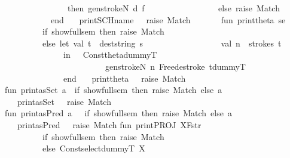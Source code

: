 \begin{isabellebody}
\ \ \ \ \ \ \ \ \ \ \ \ \ \ \ then\ genstrokeN\ d\ f\ \ \isanewline
\ \ \ \ \ \ \ \ \ \ \ \ \ \ \ else\ raise\ Match\isanewline
\ \ \ \ \ \ \ \ \ \ \ end{\isacharparenright}\isanewline
\ \ \ {\isacharbar}print{\isacharunderscore}SCH{\isacharunderscore}name\ {\isacharunderscore}\ {\isacharequal}\ {\isacharparenleft}raise\ Match{\isacharparenright}{\isacharsemicolon}\ \ \isanewline
\ \ \ \ \isanewline
fun\ print{\isacharunderscore}theta\ {\isacharbrackleft}s{\isacharcomma}e{\isacharbrackright}\ {\isacharequal}\isanewline
\ \ \ \ \ \ \ \ \ if\ {\isacharbang}show{\isacharunderscore}full{\isacharunderscore}sem\ then\ raise\ Match\ \isanewline
\ \ \ \ \ \ \ \ \ else\ let\ val\ t\ {\isacharequal}\ dest{\isacharunderscore}string\ s{\isacharsemicolon}\isanewline
\ \ \ \ \ \ \ \ \ \ \ \ \ \ \ \ \ \ val\ n\ {\isacharequal}\ strokes\ t{\isacharsemicolon}\isanewline
\ \ \ \ \ \ \ \ \ \ \ \ \ \ in\ \ \ Const{\isacharparenleft}{\isachardoublequote}{\isacharpercent}theta{\isachardoublequote}{\isacharcomma}dummyT{\isacharparenright}{\isachardollar}\isanewline
\ \ \ \ \ \ \ \ \ \ \ \ \ \ \ \ \ \ \ \ \ \ \ \ {\isacharparenleft}genstrokeN\ n\ {\isacharparenleft}Free{\isacharparenleft}destroke\ t{\isacharcomma}dummyT{\isacharparenright}{\isacharparenright}{\isacharparenright}\ \isanewline
\ \ \ \ \ \ \ \ \ \ \ \ \ \ end\isanewline
\ \ \ {\isacharbar}print{\isacharunderscore}theta\ {\isacharunderscore}\ {\isacharequal}\ raise\ Match\isanewline
\ \ \ \ \isanewline
fun\ print{\isacharunderscore}asSet\ {\isacharbrackleft}a{\isacharbrackright}\ {\isacharequal}\ if\ {\isacharbang}show{\isacharunderscore}full{\isacharunderscore}sem\ then\ raise\ Match\ else\ a\isanewline
\ \ \ {\isacharbar}print{\isacharunderscore}asSet\ {\isacharunderscore}\ {\isacharequal}\ raise\ Match{\isacharsemicolon}\isanewline
\isanewline
fun\ print{\isacharunderscore}asPred\ {\isacharbrackleft}a{\isacharbrackright}\ {\isacharequal}\ \ if\ {\isacharbang}show{\isacharunderscore}full{\isacharunderscore}sem\ then\ raise\ Match\ else\ a\isanewline
\ \ \ {\isacharbar}print{\isacharunderscore}asPred\ {\isacharunderscore}\ {\isacharequal}\ raise\ Match\isanewline
\isanewline
fun\ print{\isacharunderscore}PROJ\ {\isacharbrackleft}X{\isacharcomma}F{\isacharcomma}str{\isacharbrackright}\ {\isacharequal}\isanewline
\ \ \ \ \ \ \ \ \ if\ {\isacharbang}show{\isacharunderscore}full{\isacharunderscore}sem\ then\ raise\ Match\isanewline
\ \ \ \ \ \ \ \ \ else\ Const{\isacharparenleft}{\isachardoublequote}{\isacharunderscore}select{\isachardoublequote}{\isacharcomma}dummyT{\isacharparenright}{\isachardollar}\ X\ {\isachardollar}\isanewline

\end{isabellebody}
